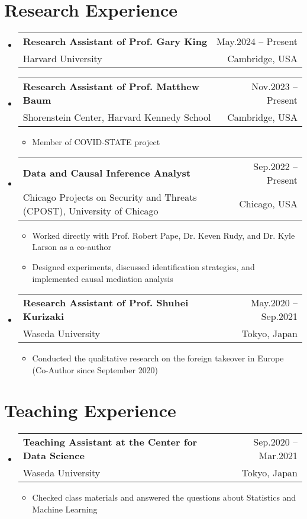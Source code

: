 \documentclass[letterpaper,11pt]{article} %
\makeatletter
\newcommand{\CVItem}[1]{
  \item\small{
    {#1 \vspace{-2pt}}
  }
}
\newcommand{\CVSubheading}[4]{
  \vspace{-2pt}\item
    \begin{tabular*}{0.97\textwidth}[t]{l@{\extracolsep{\fill}}r}
      \textbf{#1} & #2 \\
      \small#3 & \small #4 \\
    \end{tabular*}\vspace{-7pt}
}
\newcommand{\CVSubHeadingListStart}{\begin{itemize}[leftmargin=0.5cm, label={}]}
\newcommand{\CVSubHeadingListEnd}{\end{itemize}}
\newcommand{\CVItemListStart}{\begin{itemize}}
\newcommand{\CVItemListEnd}{\end{itemize}\vspace{-5pt}}
\makeatother
\begin{document}
\section{Research Experience}
\CVSubHeadingListStart
\CVSubheading
      {Research Assistant of Prof. Gary King}{May.2024 -- Present}
      {Harvard University}{Cambridge, USA}

\CVSubheading
      {Research Assistant of Prof. Matthew Baum}{Nov.2023 -- Present}
      {Shorenstein Center, Harvard Kennedy School}{Cambridge, USA}
      \CVItemListStart
        \CVItem{Member of COVID-STATE project}
      \CVItemListEnd

\CVSubheading
      {Data and Causal Inference Analyst}{Sep.2022 -- Present}
      {Chicago Projects on Security and Threats (CPOST), University of Chicago}{Chicago, USA}
      \CVItemListStart
        \CVItem{Worked directly with Prof. Robert Pape, Dr. Keven Rudy, and Dr. Kyle Larson as a co-author}
        \CVItem{Designed experiments, discussed identification strategies, and implemented causal mediation analysis}
      \CVItemListEnd

    \CVSubheading
      {Research Assistant of Prof. Shuhei Kurizaki}{May.2020 -- Sep.2021}
      {Waseda University}{Tokyo, Japan}
      \CVItemListStart
        \CVItem{Conducted the qualitative research on the foreign takeover in Europe (Co-Author since September 2020)}
      \CVItemListEnd
\CVSubHeadingListEnd

\section{Teaching Experience}
\CVSubHeadingListStart
    \CVSubheading
      {Teaching Assistant at the Center for Data Science}{Sep.2020 -- Mar.2021}
      {Waseda University}{Tokyo, Japan}
      \CVItemListStart
        \CVItem {Checked class materials and answered the questions about Statistics and Machine Learning}
      \CVItemListEnd
  \CVSubHeadingListEnd


\end{document}
